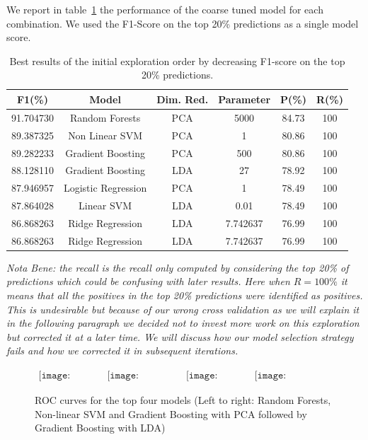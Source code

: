 We report in table~\ref{initial_results} the performance of the coarse tuned model for each combination. We used the F1-Score on the top 20\% predictions as a single model score.

\begin{table}[h]
\begin{center}
\begin{tabular}{c c c c c c}
\hline
\textbf{F1(\%)} & \textbf{Model} & \textbf{Dim. Red.} & \textbf{Parameter} & \textbf{P(\%)} & \textbf{R(\%)}\\ 
\hline\hline
91.704730 & Random Forests & PCA & 5000 & 84.73 & 100\\
89.387325 & Non Linear SVM & PCA & 1 & 80.86 & 100\\
89.282233 & Gradient Boosting & PCA & 500 & 80.86 & 100\\
88.128110 & Gradient Boosting & LDA & 27 & 78.92 & 100\\
87.946957 & Logistic Regression & PCA & 1 & 78.49 & 100\\
87.864028 & Linear SVM & LDA & 0.01 & 78.49 & 100\\
86.868263 & Ridge Regression & LDA & 7.742637 & 76.99 & 100\\
86.868263 & Ridge Regression & LDA & 7.742637 & 76.99 & 100\\
\end{tabular}
\end{center}
\caption{\label{initial_results}Best results of the initial exploration order by decreasing F1-score on the top 20\% predictions.}
\end{table}

\textit{Nota Bene: the recall is the recall only computed by considering the top 20\% of predictions which could be confusing with later results. Here when $R=100\%$ it means that all the positives in the top 20\% predictions were identified as positives. This is undesirable but because of our wrong cross validation as we will explain it in the following paragraph we decided not to invest more work on this exploration but corrected it at a later time. We will discuss how our model selection strategy fails and how we corrected it in subsequent iterations.}

\begin{figure}[h]
\begin{center}$
\begin{array}{cccc}
\texttt{[image: ROC\_RF]} &
\texttt{[image: ROC\_NSVM]} &
\texttt{[image: ROC\_GB]} &
\texttt{[image: ROC\_GBLDA]} 
\end{array}$
\end{center}
\caption{\label{ROC_init} ROC curves for the top four models (Left to right: Random Forests, Non-linear SVM and Gradient Boosting with PCA followed by Gradient Boosting with LDA)}
\end{figure}

